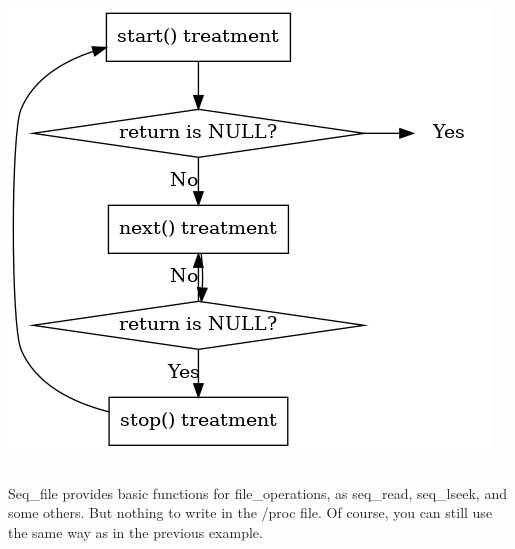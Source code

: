 \documentclass[11pt]{article}
\begin{document}
\begin{center}
\includegraphics[width=.9\linewidth]{img/seq_file.png}
\end{center}
\begin{center}
\begin{tabular}{}
\\
\end{tabular}
\end{center}
Seq\_file provides basic functions for file\_operations, as seq\_read, seq\_lseek, and some others. But nothing to write in the /proc file. Of course, you can still use the same way as in the previous example.
\end{document}
